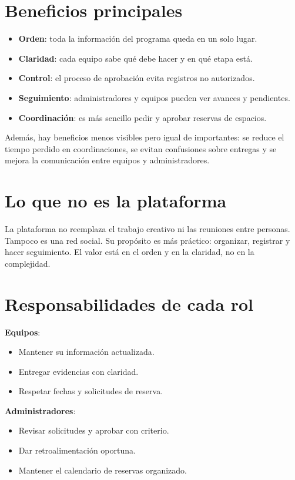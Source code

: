 \documentclass[12pt]{article}
\begin{document}
\section{Beneficios principales}
\begin{itemize}
  \item \textbf{Orden}: toda la información del programa queda en un solo lugar.
  \item \textbf{Claridad}: cada equipo sabe qué debe hacer y en qué etapa está.
  \item \textbf{Control}: el proceso de aprobación evita registros no autorizados.
  \item \textbf{Seguimiento}: administradores y equipos pueden ver avances y pendientes.
  \item \textbf{Coordinación}: es más sencillo pedir y aprobar reservas de espacios.
\end{itemize}

Además, hay beneficios menos visibles pero igual de importantes: se reduce el tiempo perdido en coordinaciones, se evitan confusiones sobre entregas y se mejora la comunicación entre equipos y administradores.

\section{Lo que no es la plataforma}
La plataforma no reemplaza el trabajo creativo ni las reuniones entre personas. Tampoco es una red social. Su propósito es más práctico: organizar, registrar y hacer seguimiento. El valor está en el orden y en la claridad, no en la complejidad.

\section{Responsabilidades de cada rol}
\textbf{Equipos}:
\begin{itemize}
  \item Mantener su información actualizada.
  \item Entregar evidencias con claridad.
  \item Respetar fechas y solicitudes de reserva.
\end{itemize}

\textbf{Administradores}:
\begin{itemize}
  \item Revisar solicitudes y aprobar con criterio.
  \item Dar retroalimentación oportuna.
  \item Mantener el calendario de reservas organizado.
\end{itemize}
\end{document}

